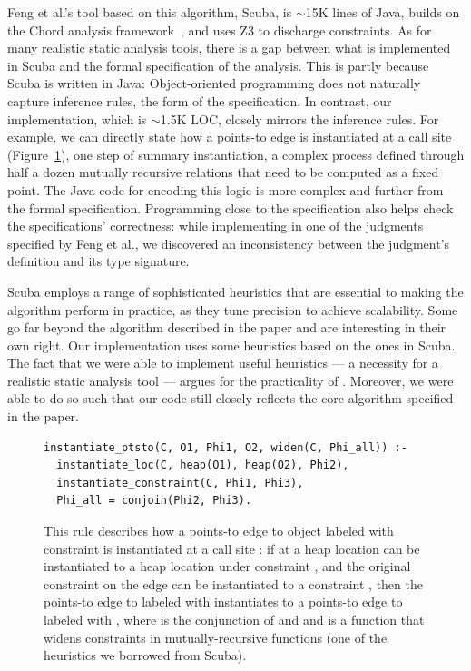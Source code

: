 \documentclass[acmsmall,screen,nonacm]{acmart}
\theoremstyle{definition}
\begin{document}
Feng et al.'s tool based on this algorithm, Scuba, is $\sim$15K lines of Java,
builds on the Chord analysis framework~\citep{chord}, and uses Z3 to discharge
constraints.
As for many realistic static analysis tools, there is a gap between what is
implemented in Scuba and the formal specification of the analysis.
This is partly because Scuba is written in Java: Object-oriented programming
does not naturally capture inference rules, the form of the specification.
In contrast, our \Name implementation, which is $\sim$1.5K LOC, closely mirrors
the inference rules.
For example, we can directly state how a points-to edge is instantiated at a
call site (Figure~\ref{fig:ptsto}), one step of summary instantiation, a
complex process defined through half a dozen mutually recursive relations that
need to be computed as a fixed point.
The Java code for encoding this logic is more complex and further from the
formal specification.
Programming close to the specification also helps check the specifications' correctness: while implementing in \Name one of the judgments specified by
Feng et al., we discovered an inconsistency between the judgment's definition
and its type signature.

Scuba employs a range of sophisticated heuristics that are essential to making
the algorithm perform in practice, as they tune precision to achieve scalability.
Some go far beyond the algorithm described in the paper and are interesting in
their own right.
Our implementation uses some heuristics based on the ones in Scuba.
The fact that we were able to implement useful heuristics --- a necessity for a
realistic static analysis tool --- argues for the practicality of \Name.
Moreover, we were able to do so such that our code still closely
reflects the core algorithm specified in the paper.

\begin{figure}[!t]
    \begin{lstlisting}
instantiate_ptsto(C, O1, Phi1, O2, widen(C, Phi_all)) :-
  instantiate_loc(C, heap(O1), heap(O2), Phi2),
  instantiate_constraint(C, Phi1, Phi3),
  Phi_all = conjoin(Phi2, Phi3).
    \end{lstlisting}
    \caption{
      This rule describes how a points-to edge to object  labeled
      with constraint  is instantiated at a call site :
      if at  a heap location  can be instantiated to a
      heap location  under constraint , and the
      original constraint on the edge  can be instantiated to a
      constraint , then the points-to edge to  labeled
      with  instantiates to a points-to edge to 
      labeled with , where  is the
      conjunction of  and  and  is a
      function that widens constraints in mutually-recursive functions (one of
      the heuristics we borrowed from Scuba).
    }
    \label{fig:ptsto}
\end{figure}
\end{document}
